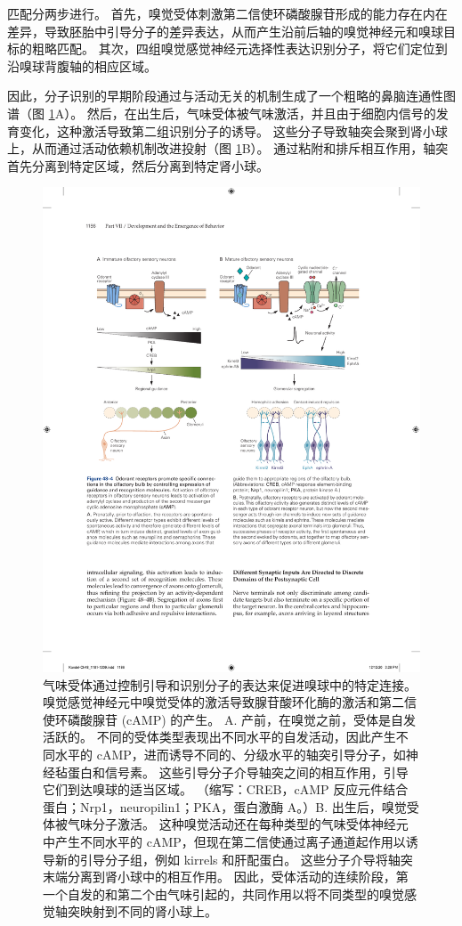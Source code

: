 匹配分两步进行。 首先，嗅觉受体刺激第二信使环磷酸腺苷形成的能力存在内在差异，导致胚胎中引导分子的差异表达，从而产生沿前后轴的嗅觉神经元和嗅球目标的粗略匹配。 其次，四组嗅觉感觉神经元选择性表达识别分子，将它们定位到沿嗅球背腹轴的相应区域。

因此，分子识别的早期阶段通过与活动无关的机制生成了一个粗略的鼻脑连通性图谱（图 \ref{fig:48_4}A）。
然后，在出生后，气味受体被气味激活，并且由于细胞内信号的发育变化，这种激活导致第二组识别分子的诱导。 这些分子导致轴突会聚到肾小球上，从而通过活动依赖机制改进投射（图 \ref{fig:48_4}B）。 通过粘附和排斥相互作用，轴突首先分离到特定区域，然后分离到特定肾小球。

\begin{figure}[htbp]
	\centering
	\includegraphics[width=0.9\linewidth]{chap48/fig_48_4}
	\caption{气味受体通过控制引导和识别分子的表达来促进嗅球中的特定连接。 嗅觉感觉神经元中嗅觉受体的激活导致腺苷酸环化酶的激活和第二信使环磷酸腺苷 (cAMP) 的产生。 A. 产前，在嗅觉之前，受体是自发活跃的。 不同的受体类型表现出不同水平的自发活动，因此产生不同水平的 cAMP，进而诱导不同的、分级水平的轴突引导分子，如神经毡蛋白和信号素。 这些引导分子介导轴突之间的相互作用，引导它们到达嗅球的适当区域。 （缩写：CREB，cAMP 反应元件结合蛋白；Nrp1，neuropilin1；PKA，蛋白激酶 A。）B. 出生后，嗅觉受体被气味分子激活。 这种嗅觉活动还在每种类型的气味受体神经元中产生不同水平的 cAMP，但现在第二信使通过离子通道起作用以诱导新的引导分子组，例如 kirrels 和肝配蛋白。 这些分子介导将轴突末端分离到肾小球中的相互作用。 因此，受体活动的连续阶段，第一个自发的和第二个由气味引起的，共同作用以将不同类型的嗅觉感觉轴突映射到不同的肾小球上。}
	\label{fig:48_4}
\end{figure}

